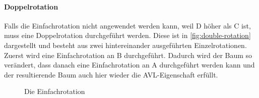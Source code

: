 \documentclass[a4paper, parskip]{scrartcl}
\begin{document}
\paragraph{Doppelrotation}
Falls die Einfachrotation nicht angewendet werden kann, weil D höher als C ist, muss eine Doppelrotation durchgeführt werden. 
Diese ist in \autoref{fig:double-rotation} dargestellt und besteht aus zwei hintereinander ausgeführten Einzelrotationen.
Zuerst wird eine Einfachrotation an B durchgeführt.
Dadurch wird der Baum so verändert, dass danach eine Einfachrotation an A durchgeführt werden kann und der resultierende Baum auch hier wieder die AVL-Eigenschaft erfüllt.

\begin{figure}
  \centering
  \caption{Die Einfachrotation}
  \label{fig:single-rotation}
\end{figure}
\end{document}
